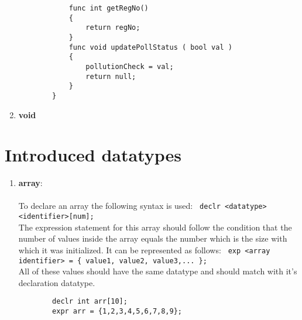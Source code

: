 \documentclass[journal, 18pt]{report}
\begin{document}
\begin{enumerate}
\begin{lstlisting}
            func int getRegNo()
            {
                return regNo;
            }
            func void updatePollStatus ( bool val )
            {
                pollutionCheck = val;
                return null;
            }
        }
    \end{lstlisting}
    \item \textbf{void}
\end{enumerate}
\section{Introduced datatypes}
\begin{enumerate}
    \item \textbf{array}:\\\\ To declare an array the following syntax is used: \texttt{ declr <datatype> <identifier>[num]; }\\
    The expression statement for this array should follow the condition that the number of values inside the array equals the number which is the size with which it was initialized. It can be represented as follows: \texttt{ exp <array identifier> = \{ value1, value2, value3,... \};}\\
    All of these values should have the same datatype and should match with it's declaration datatype.\\
    \begin{lstlisting}
        declr int arr[10];
        expr arr = {1,2,3,4,5,6,7,8,9};


\end{lstlisting}
\end{enumerate}
\end{document}
